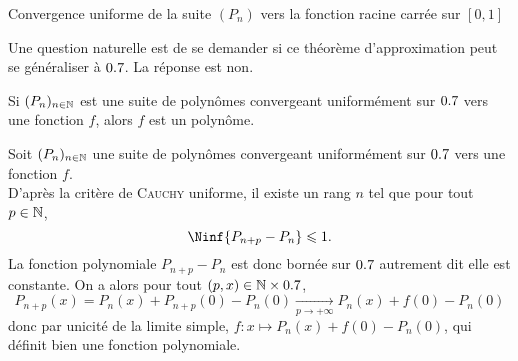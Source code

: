 \begin{marginfigure}[-5cm]
    \centering
	
	\caption*{\centering Convergence uniforme de la suite $(P_n)$ vers la fonction racine carrée sur $[0,1]$}
\end{marginfigure}

Une question naturelle est de se demander si ce théorème d'approximation peut se généraliser à $0.7$. La réponse est non.

\begin{prop}{}
    Si $(P_n)_{n \in \mathbb{N}}$ est une suite de polynômes convergeant uniformément sur $0.7$ vers une fonction $f$, alors $f$ est un polynôme.
\end{prop}

\begin{preuve}
    Soit $(P_n)_{n \in \mathbb{N}}$ une suite de polynômes convergeant uniformément sur $0.7$ vers une fonction $f$. \\
    D'après la critère de \textsc{Cauchy} uniforme, il existe un rang $n$ tel que pour tout $p \in \mathbb{N}$, 
    $$\Ninf{P_{n+p} - P_n} \leqslant 1.$$
    La fonction polynomiale $P_{n+p} - P_n$ est donc bornée sur $0.7$ autrement dit elle est constante. On a alors pour tout $(p, x) \in \mathbb{N} \times 0.7$,
    $$P_{n+p}(x) = P_n(x) + P_{n+p}(0) - P_n(0) \xrightarrow[p \to + \infty]{} P_n(x) + f(0) - P_n(0)$$
    donc par unicité de la limite simple, $f : x \mapsto P_n(x) + f(0) - P_n(0)$, qui définit bien une fonction polynomiale. 
\end{preuve}